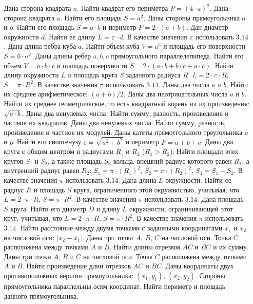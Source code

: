 Дана сторона квадрата $a$. Найти квадрат его периметра $P = (4 \cdot a)^2$.
Дана сторона квадрата $a$. Найти его площадь $S = a^2$.
Даны стороны прямоугольника $a$ и $b$. Найти его площадь $S = a \cdot b$ и периметр $P = 2 \cdot (a + b)$.
Дан диаметр окружности $d$. Найти ее длину $L = \pi \cdot d$. В качестве значения $\pi$ использовать $3.14$.
Дана длина ребра куба $a$. Найти объем куба $V = a^3$ и площадь его поверхности $S = 6 \cdot a^2$.
Даны длины ребер $a, b, c$ прямоугольного параллелепипеда. Найти его объем $V = a \cdot b \cdot c$ и площадь поверхности $S = 2 \cdot (a \cdot b + b \cdot c + a \cdot c)$.
Найти длину окружности $L$ и площадь круга $S$ заданного радиуса $R$: $L = 2 \cdot \pi \cdot R$, $S = \pi \cdot R^2$. В качестве значения $\pi$ использовать $3.14$.
Даны два числа $a$ и $b$. Найти их среднее арифметическое: $(a + b)/2$.
Даны два неотрицательных числа $a$ и $b$. Найти их среднее геометрическое, то есть квадратный корень из их произведения: $\sqrt{a \cdot b}$.
Даны два ненулевых числа. Найти сумму, разность, произведение и частное их квадратов.
Даны два ненулевых числа. Найти сумму, разность, произведение и частное их модулей.
Даны катеты прямоугольного треугольника $a$ и $b$. Найти его гипотенузу $c = \sqrt{a^2 + b^2}$ и периметр $P = a + b + c$.
Даны два круга с общим центром и радиусами $R_1$ и $R_2$ ($R_1 > R_2$). Найти площади этих кругов $S_1$ и $S_2$, а также площадь $S_3$ кольца, внешний радиус которого равен $R_1$, а внутренний радиус равен $R_2$: $S_1 = \pi \cdot (R_1)^2$, $S_2 = \pi \cdot (R_2)^2$, $S_3 = S_1 - S_2$. В качестве значения $\pi$ использовать $3.14$.
Дана длина $L$ окружности. Найти ее радиус $R$ и площадь $S$ круга, ограниченного этой окружностью, учитывая, что $L = 2 \cdot \pi \cdot R$, $S = \pi \cdot R^2$. В качестве значения $\pi$ использовать $3.14$.
Дана площадь $S$ круга. Найти его диаметр $D$ и длину $L$ окружности, ограничивающей этот круг, учитывая, что $L = 2 \cdot \pi \cdot R$, $S = \pi \cdot R^2$. В качестве значения $\pi$ использовать $3.14$.
Найти расстояние между двумя точками с заданными координатами $x_1$ и $x_2$ на числовой оси: $|x_2 - x_1|$.
Даны три точки $A$, $B$, $C$ на числовой оси. Точка $C$ расположена между точками $A$ и $B$. Найти длины отрезков $AC$ и $BC$ и их сумму.
Даны три точки $A$, $B$ и $C$ на числовой оси. Точка $C$ расположена между точками $A$ и $B$. Найти произведение длин отрезков $AC$ и $BC$.
Даны координаты двух противоположных вершин прямоугольника: $(x_1, y_1)$, $(x_2, y_2)$. Стороны прямоугольника параллельны осям координат. Найти периметр и площадь данного прямоугольника.
